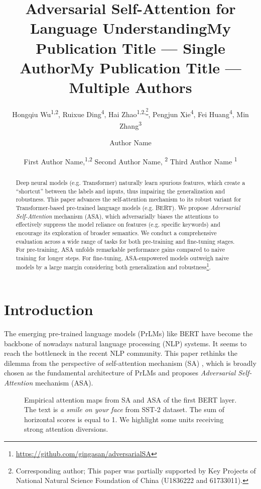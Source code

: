 \documentclass[letterpaper]{article} \usepackage{aaai23}  \usepackage{times}  \usepackage{helvet}  \usepackage{courier}  \usepackage[hyphens]{url}  \usepackage{graphicx} \urlstyle{rm} \def\UrlFont{\rm}  \usepackage{natbib}  \usepackage{caption} \frenchspacing  \setlength{\pdfpagewidth}{8.5in}  \setlength{\pdfpageheight}{11in}  \usepackage{algorithm}
\title{Adversarial Self-Attention for Language Understanding}
\author{
Hongqiu Wu\textsuperscript{\rm 1,2},
    Ruixue Ding\textsuperscript{\rm 4},
    Hai Zhao\textsuperscript{\rm 1,2,\thanks{Corresponding author; This paper was partially supported by Key Projects of National Natural Science Foundation of China (U1836222 and 61733011).}},
    Pengjun Xie\textsuperscript{\rm 4},
    Fei Huang\textsuperscript{\rm 4},
    Min Zhang\textsuperscript{\rm 3}\\
}
\title{My Publication Title --- Single Author}
\author {
    Author Name
}
\title{My Publication Title --- Multiple Authors}
\author {
First Author Name,\textsuperscript{\rm 1,\rm 2}
    Second Author Name, \textsuperscript{\rm 2}
    Third Author Name \textsuperscript{\rm 1}
}
\begin{document}
\maketitle

\begin{abstract}
Deep neural models (e.g. Transformer) naturally learn spurious features, which create a ``shortcut'' between the labels and inputs, thus impairing the generalization and robustness. This paper advances the self-attention mechanism to its robust variant for Transformer-based pre-trained language models (e.g. BERT). We propose \textit{Adversarial Self-Attention} mechanism (ASA), which adversarially biases the attentions to effectively suppress the model reliance on features (e.g. specific keywords) and encourage its exploration of broader semantics. We conduct a comprehensive evaluation across a wide range of tasks for both pre-training and fine-tuning stages. For pre-training, ASA unfolds remarkable performance gains compared to naive training for longer steps. For fine-tuning, ASA-empowered models outweigh naive models by a large margin considering both generalization and robustness\footnote{\url{https://github.com/gingasan/adversarialSA}}.
\end{abstract}

\section{Introduction}

The emerging pre-trained language models (PrLMs) like BERT \citep{DBLP:conf/naacl/DevlinCLT19} have become the backbone of nowadays natural language processing (NLP) systems. It seems to reach the bottleneck in the recent NLP community. This paper rethinks the dilemma from the perspective of self-attention mechanism (SA) \citep{DBLP:conf/nips/VaswaniSPUJGKP17}, which is broadly chosen as the fundamental architecture of PrLMs and proposes \textit{Adversarial Self-Attention} mechanism (ASA).

\begin{figure}
\centering
{}
\caption{Empirical attention maps from SA and ASA of the first BERT layer. The text is \textit{a smile on your face} from SST-2 dataset. The sum of horizontal scores is equal to 1. We highlight some units receiving strong attention diversions.}
\label{f5}
\end{figure}
\end{document}

